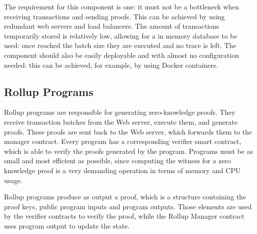 The requirement for this component is one: it must not be a bottleneck when receiving transactions and sending proofs. This can be achieved by using redundant web servers and load balancers. The amount of transactions temporarily stored is relatively low, allowing for a in memory database to be used: once reached the batch size they are executed and no trace is left. The component should also be easily deployable and with almost no configuration needed: this can be achieved, for example, by using Docker containers.

\subsection{Rollup Programs\label{sec:designrollupprograms}}
Rollup programs are responsible for generating zero-knowledge proofs. They receive transaction batches from the Web server, execute them, and generate proofs. These proofs are sent back to the Web server, which forwards them to the manager contract. Every program has a corresponding verifier smart contract, which is able to verify the proofs generated by the program. Programs must be as small and most efficient as possible, since computing the witness for a zero knowledge proof is a very demanding operation in terms of memory and CPU usage.

Rollup programs produce as output a proof, which is a structure containing the proof keys, public program inputs and program outputs. Those elements are used by the verifier contracts to verify the proof, while the Rollup Manager contract uses program output to update the state.
